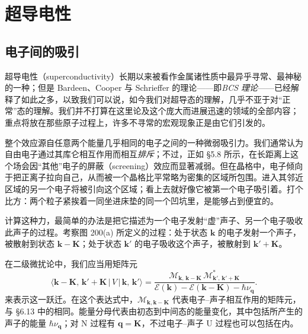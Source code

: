 
\chapter{超导电性}


\section{电子间的吸引}

超导电性（superconductivity）长期以来被看作金属诸性质中最异乎寻常、最神秘的一种；但是 Bardeen、Cooper 与 Schrieffer 的理论——即\emph{BCS 理论}——已经解释了如此之多，以致我们可以说，如今我们对超导态的理解，几乎不亚于对“正常”态的理解。我们并不打算在这里论及这个庞大而进展迅速的领域的全部内容；重点将放在那些原子过程上，许多不寻常的宏观现象正是由它们引发的。


整个效应源自任意两个能量几乎相同的电子之间的一种微弱吸引力。我们通常认为自由电子通过其库仑相互作用而相互\emph{排斥}；不过，正如 §5.8 所示，在长距离上这个场会因“其他”电子的屏蔽（screening）效应而显著减弱。但在晶格中，电子倾向于把正离子拉向自己，从而被一个晶格比平常略为密集的区域所包围。进入其邻近区域的另一个电子将被引向这个区域；看上去就好像它被第一个电子吸引着。打个比方：两个粒子紧挨着一同坐进床垫的同一个凹坑里，是能够占到便宜的。

计算这种力，最简单的办法是把它描述为一个电子发射“虚”声子、另一个电子吸收此声子的过程。考察图 200(a) 所定义的过程：处于状态 $\mathbf{k}$ 的电子发射一个声子，被散射到状态 $\mathbf{k}-\mathbf{K}$；处于状态 $\mathbf{k}'$ 的电子吸收这个声子，被散射到 $\mathbf{k}'+\mathbf{K}$。


在二级微扰论中，我们应当用矩阵元
\begin{equation*}
\langle \mathbf{k}-\mathbf{K},\,\mathbf{k}'+\mathbf{K}\,|\,V\,|\,\mathbf{k},\,\mathbf{k}'\rangle
=\frac{\mathcal{M}_{\mathbf{k},\,\mathbf{k}-\mathbf{K}}\,\mathcal{M}^{*}_{\mathbf{k}',\,\mathbf{k}'+\mathbf{K}}}{\mathcal{E}(\mathbf{k})-\mathcal{E}(\mathbf{k}-\mathbf{K})-\hbar\nu_{\mathbf{q}}}.
\tag{11.1}
\end{equation*}
来表示这一跃迁。在这个表达式中，$\mathcal{M}_{\mathbf{k},\mathbf{k}-\mathbf{K}}$ 代表电子–声子相互作用的矩阵元，与 §6.13 中的相同。能量分母代表由初态到中间态的能量变化，其中包括所产生的声子的能量 $\hbar\nu_{\mathbf{q}}$；对 N 过程有 $\mathbf{q}=\mathbf{K}$，不过电子–声子 U 过程也可以包括在内。

